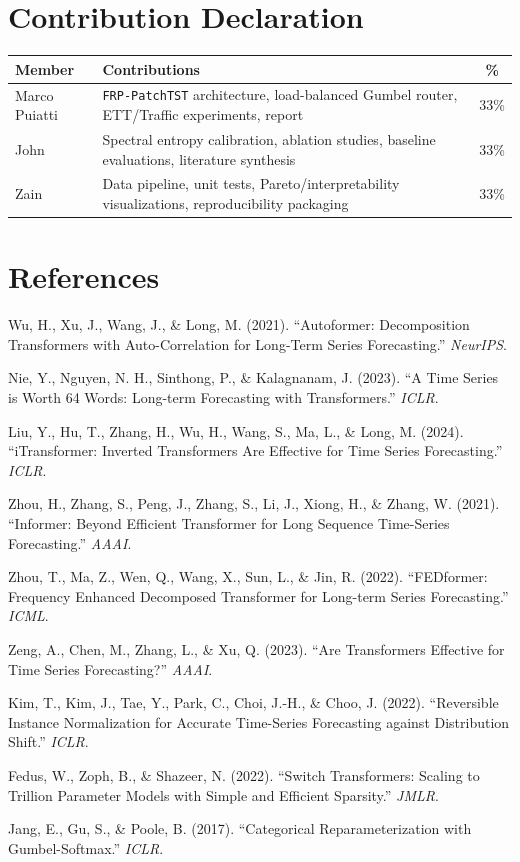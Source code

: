 \documentclass[11pt, letterpaper]{article}
\begin{document}
\section{Contribution Declaration}
\noindent\begin{tabular}{lp{}c}
\toprule
\textbf{Member} & \textbf{Contributions} & \textbf{\%} \\
\midrule
Marco Puiatti & \texttt{FRP-PatchTST} architecture, load-balanced Gumbel router, ETT/Traffic experiments, report & 33\% \\
John & Spectral entropy calibration, ablation studies, baseline evaluations, literature synthesis & 33\% \\
Zain & Data pipeline, unit tests, Pareto/interpretability visualizations, reproducibility packaging & 33\% \\
\bottomrule
\end{tabular}

\section{References}
\begin{enumerate}[label={[\arabic*]},leftmargin=*]
  \item Wu, H., Xu, J., Wang, J., \& Long, M. (2021). ``Autoformer: Decomposition Transformers with Auto-Correlation for Long-Term Series Forecasting.'' \textit{NeurIPS}.
  \item Nie, Y., Nguyen, N. H., Sinthong, P., \& Kalagnanam, J. (2023). ``A Time Series is Worth 64 Words: Long-term Forecasting with Transformers.'' \textit{ICLR}.
  \item Liu, Y., Hu, T., Zhang, H., Wu, H., Wang, S., Ma, L., \& Long, M. (2024). ``iTransformer: Inverted Transformers Are Effective for Time Series Forecasting.'' \textit{ICLR}.
  \item Zhou, H., Zhang, S., Peng, J., Zhang, S., Li, J., Xiong, H., \& Zhang, W. (2021). ``Informer: Beyond Efficient Transformer for Long Sequence Time-Series Forecasting.'' \textit{AAAI}.
  \item Zhou, T., Ma, Z., Wen, Q., Wang, X., Sun, L., \& Jin, R. (2022). ``FEDformer: Frequency Enhanced Decomposed Transformer for Long-term Series Forecasting.'' \textit{ICML}.
  \item Zeng, A., Chen, M., Zhang, L., \& Xu, Q. (2023). ``Are Transformers Effective for Time Series Forecasting?'' \textit{AAAI}.
  \item Kim, T., Kim, J., Tae, Y., Park, C., Choi, J.-H., \& Choo, J. (2022). ``Reversible Instance Normalization for Accurate Time-Series Forecasting against Distribution Shift.'' \textit{ICLR}.
  \item Fedus, W., Zoph, B., \& Shazeer, N. (2022). ``Switch Transformers: Scaling to Trillion Parameter Models with Simple and Efficient Sparsity.'' \textit{JMLR}.
  \item Jang, E., Gu, S., \& Poole, B. (2017). ``Categorical Reparameterization with Gumbel-Softmax.'' \textit{ICLR}.
\end{enumerate}
\end{document}
